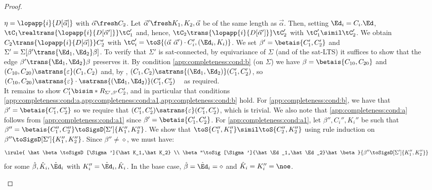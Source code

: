 \begin{proof}
\begin{asparaitem}
\item $\eta=\lopapp{i}{D[\vec\alpha]}$ with $\vec\alpha\fresh C_2$.
  Let $\vec\alpha'\fresh K_1,K_2,\vec\alpha$ be of the same length as $\vec\alpha$.
Then, setting $\Ed_i=C_i.\Ed$, $\tC_1\realtrans{\lopapp{i}{D[\vec\alpha']}}\tC_1'$ and, hence, $\tC_2\trans{\lopapp{i}{D[\vec\alpha']}}\tC_2'$ with $\tC_1'\simil\tC_2'$.
We obtain $C_2\trans{\lopapp{i}{D[\vec\alpha]}}C_2'$ with 
 $\tC_i'=\toS{(\vec\alpha\ \vec\alpha')\cdot C_i',(\Ed_i,K_i)}$. We set $\beta'=\betais{C_1',C_2'}$ and $\Sigma'=\Sigma[\beta'\trans{\Ed_1,\Ed_2}\beta]$.
To verify 
that $\Sigma'$ is sat-connected, by equivariance of $\Sigma$ (and of the sat-LTS) it suffices to show that the edge $\beta'\trans{\Ed_1,\Ed_2}\beta$ preserves it.
By condition \cref{app:completeness:cond:b} (on $\Sigma$) we have $\beta=\betais{C_{10},C_{20}}$  and $(C_{10},C_{20})\satrans{\varepsilon}( C_1, C_2)$ and, by , $(C_1,C_2)\satrans{(\Ed_1,\Ed_2)}(C_1',C_2')$, so \
$
(C_{10},C_{20})\satrans{\varepsilon}\cdot\satrans{(\Ed_1,\Ed_2)}( C_1', C_2')
$ \
as required.\\
It remains to show $C_1'\bisim*R_{\Sigma',\beta'}C_2'$, and in particular that conditions \cref{app:completeness:cond:a,app:completeness:cond:a1,app:completeness:cond:b} hold. %
For \cref{app:completeness:cond:b}, we have that $\beta'=\betais{C_1',C_2'}$ so
we require that $(C_1',C_2')\satrans{\varepsilon}(C_1',C_2')$, which is trivial.
We also note that \cref{app:completeness:cond:a} follows from \cref{app:completeness:cond:a1} since $\beta'=\betais{C_1',C_2'}$.
%
For \cref{app:completeness:cond:a1}, let $\beta'',C_i'',K_i''$ be such that $\beta''=\betais{C_1'',C_2''}\toSigsD[\Sigma']{K_1'',K_2''}$. We show that $\toS{C_1'',K_1''}\simil\toS{C_2'',K_2''}$ using rule induction on 
$\beta''\toSigsD[\Sigma']{K_1'',K_2''}$. Since $\beta''\not=\diamond$, we must have:
  \[
    \irule{
      \hat\beta\toSigsD[\Sigma']{\hat K_1,\hat K_2}
      \\
      \beta''\toSig[\Sigma']{\hat\Ed_1,\hat\Ed_2}\hat\beta
    }{
      \beta''\toSigsD[\Sigma']{K_1'',K_2''}
    }
  \]
  for some $\hat\beta,\hat K_i,\hat\Ed_i$ with $K_i''=\hat\Ed_i,\hat K_i$. In the base case, $\hat\beta=\hat\Ed_i=\diamond$ and $\hat K_i=K_i''={\noe}$.

\end{asparaitem}
\end{proof}
